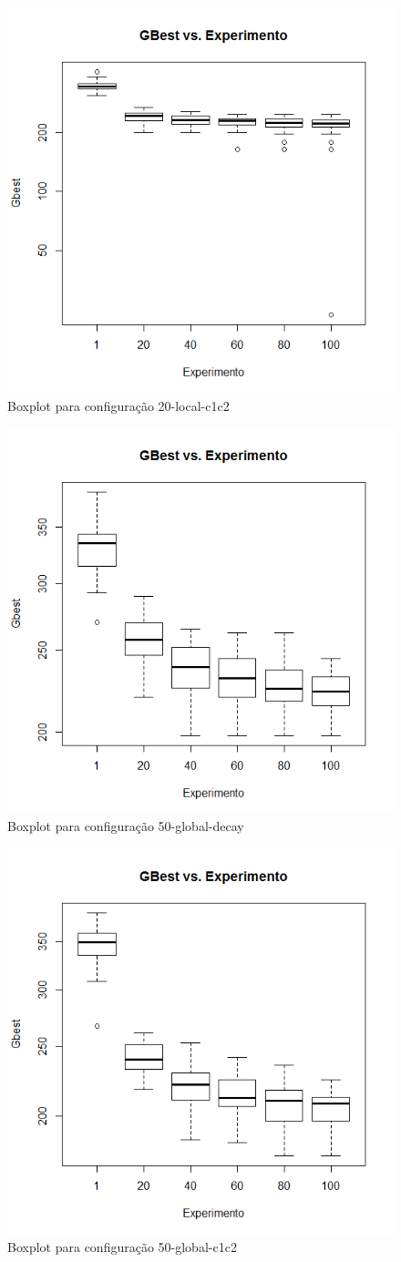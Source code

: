 \begin{figure}[H]
	\centering
	\includegraphics[width=.6\textwidth]{img/result_20_local_c1c2.png}
	\caption{Boxplot para configura\c{c}\~ao 20-local-c1c2}
	\label{fig:result_20_local_c1c2}
\end{figure}

\begin{figure}[H]
	\centering
	\includegraphics[width=.6\textwidth]{img/result_50_global_decay.png}
	\caption{Boxplot para configura\c{c}\~ao 50-global-decay}
	\label{fig:result_50_global_decay}
\end{figure}

\begin{figure}[H]
	\centering
	\includegraphics[width=.6\textwidth]{img/result_50_global_c1c2.png}
	\caption{Boxplot para configura\c{c}\~ao 50-global-c1c2}
	\label{fig:result_50_global_c1c2}
\end{figure}

